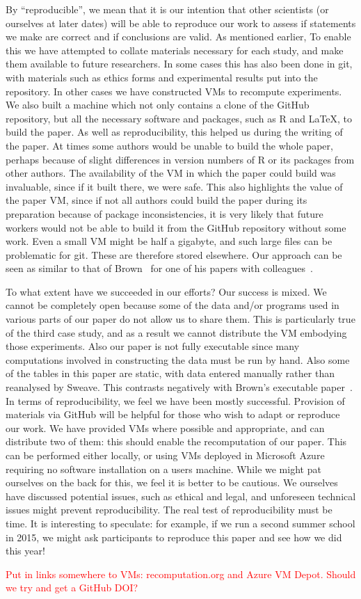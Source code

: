 By ``reproducible'', we mean that it is our intention that other scientists (or
ourselves at later dates) will be able to reproduce our work to assess if
statements we make are correct and if conclusions are valid.  
As mentioned earlier, 
To enable this we
have attempted to collate materials necessary for each study, and make them
available to future researchers.  
In some cases this has also been done in git,
with materials such as ethics forms and experimental results put into the repository.  
In other cases we have constructed VMs to recompute experiments.  
We also built a machine which not only contains a clone of the GitHub repository, but all the necessary software and packages, such as R and \LaTeX, to build the paper.
As well as reproducibility, this helped us during the writing of the paper.  At times some authors would be unable to build the whole paper, perhaps because of slight differences in version numbers of R or its packages from other authors.  The availability of the VM in which the paper could build was invaluable, since if it built there, we were safe.  This also highlights the value of the paper VM, since if not all authors could build the paper during its preparation because of package inconsistencies, it is very likely that future workers would not be able to build it from the GitHub repository without some work.
Even a small VM 
might be half a gigabyte, and such large files can be problematic for git.
These are therefore stored elsewhere.  
Our approach can be seen as similar to that of Brown~\cite{brown} for one of his papers with colleagues~\cite{Brown2012}.


To what extent have we succeeded in our efforts?
Our success is mixed.  We cannot be completely open because
some of the data and/or programs used in various parts of our paper do not allow us to share them.  This is particularly true of the third case study, and as a result we cannot distribute the VM embodying those experiments. Also our paper is not fully executable since 
many computations involved in constructing the data must be run by hand.  Also some of the tables in this paper are static, with data entered manually rather than reanalysed by Sweave. This contrasts negatively with Brown's executable paper~\cite{brown}.  
In terms of reproducibility, we feel we have been mostly successful.  
Provision of materials via GitHub will be helpful for those who wish to adapt or reproduce our work.
We have provided VMs where possible and appropriate, and can distribute two of them: this should enable the recomputation of our paper.  This can be performed either locally, or using VMs deployed in Microsoft Azure requiring no software installation on a users machine. 
While we might pat ourselves on the back for this, we feel it is better to be cautious. We ourselves have discussed potential issues, such as ethical and legal, and unforeseen technical issues might prevent reproducibility. The real test of reproducibility must be time.
It is interesting to speculate: for example, if we run a second summer school in 2015, we might ask participants to reproduce this paper and see how we did this year!

\textcolor{red}{Put in links somewhere to VMs: recomputation.org and Azure VM Depot. Should we try and get a GitHub DOI?}


